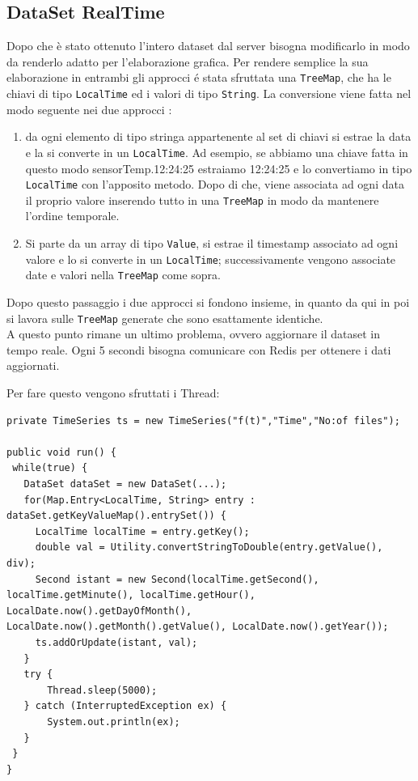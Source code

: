 \subsection{DataSet RealTime}
Dopo che è stato ottenuto l'intero dataset dal server bisogna modificarlo in modo da renderlo adatto per l'elaborazione grafica.
Per rendere semplice la sua elaborazione in entrambi gli approcci é stata sfruttata una \texttt{TreeMap}, che ha le chiavi
di tipo \texttt{LocalTime} ed i valori di tipo \texttt{String}.
La conversione viene fatta nel modo seguente nei due approcci :
\begin{enumerate}
    \item da ogni elemento di tipo stringa appartenente al set di chiavi si estrae la data e la si converte
    in un \texttt{LocalTime}.
    Ad esempio, se abbiamo una chiave fatta in questo modo sensorTemp.12:24:25 estraiamo 12:24:25 e lo convertiamo in tipo \texttt{LocalTime} con l'apposito metodo.
    Dopo di che, viene associata ad ogni data il proprio valore inserendo tutto in una \texttt{TreeMap} in modo da mantenere l'ordine temporale.
    \item Si parte da un array di tipo \texttt{Value}, si estrae il timestamp associato ad ogni valore e lo si converte in un \texttt{LocalTime}; successivamente vengono associate date
    e valori nella \texttt{TreeMap} come sopra.
\end{enumerate}
Dopo questo passaggio i due approcci si fondono insieme, in quanto da qui in poi si lavora sulle \texttt{TreeMap} generate che sono esattamente identiche.\\

A questo punto rimane un ultimo problema, ovvero aggiornare il dataset in tempo reale.
Ogni 5 secondi bisogna comunicare con Redis per ottenere i dati aggiornati.

Per fare questo vengono sfruttati i Thread:


\begin{lstlisting}[autogobble, title={\texttt{DataSetRealTime.java}}]
private TimeSeries ts = new TimeSeries("f(t)","Time","No:of files");

public void run() {
 while(true) {
   DataSet dataSet = new DataSet(...);
   for(Map.Entry<LocalTime, String> entry : dataSet.getKeyValueMap().entrySet()) {
     LocalTime localTime = entry.getKey();
     double val = Utility.convertStringToDouble(entry.getValue(), div);
     Second istant = new Second(localTime.getSecond(), localTime.getMinute(), localTime.getHour(), LocalDate.now().getDayOfMonth(), LocalDate.now().getMonth().getValue(), LocalDate.now().getYear());
     ts.addOrUpdate(istant, val);
   }
   try {
       Thread.sleep(5000);
   } catch (InterruptedException ex) {
       System.out.println(ex);
   }
 }
}
\end{lstlisting}

